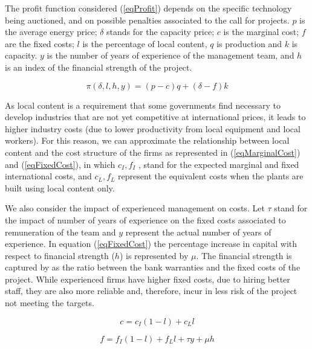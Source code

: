 \documentclass[informs]{informs3}
\begin{document}
The profit function considered (\ref{eqProfit}) depends on the specific technology being auctioned, and on possible penalties associated to the call for projects. $p$ is the average energy price; $\delta$ stands for the capacity price; $c$  is the marginal cost;  $f$  are the fixed costs; $l$  is the percentage of local content, $q$ is production and $k$ is capacity. $y$ is the number of years of experience of the management team, and $h$ is an index of the financial strength of the project.


\begin{equation} \label{eqProfit}
\pi(\delta,l,h,y) = (p-c)q+(\delta-f)k
\end{equation}


As local content is a requirement that some governments find necessary to develop industries that are not yet competitive at international prices, it leads to higher industry costs (due to lower productivity from local equipment and local workers). For this reason, we can approximate the relationship between local content and the cost structure of the firms as represented in (\ref{eqMarginalCost}) and (\ref{eqFixedCost}), in which $c_I, f_I$ , stand for the expected marginal and fixed international costs, and $c_L, f_L$  represent the equivalent costs when the plants are built using local content only. 

We also consider the impact of experienced management on costs. Let $\tau$  stand for the impact of number of years of experience on the fixed costs associated to remuneration of the team and $y$ represent the actual number of years of experience. In equation (\ref{eqFixedCost}) the percentage increase in capital with respect to financial strength ($h$) is represented by $\mu$. The financial strength is captured by as the ratio between the bank warranties and the fixed costs of the project. While experienced firms have higher fixed costs, due to hiring better staff, they are also more reliable and, therefore, incur in less risk of the project not meeting the targets.  


\begin{equation} \label{eqMarginalCost}
c = c_I(1-l)+c_Ll
\end{equation}

\begin{equation} \label{eqFixedCost}
f = f_I(1-l)+f_Ll+\tau y+\mu h
\end{equation}
\end{document}
